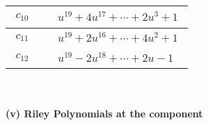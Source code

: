 \documentclass[1p]{elsarticle_modified}
\theoremstyle{definition}
\begin{document}
\begin{tabular}{m{50pt}|m{274pt}}
\hline $$\begin{aligned}c_{10}\end{aligned}$$&$\begin{aligned}
&u^{19}+4 u^{17}+\cdots+2 u^3+1
\end{aligned}$\\
\hline $$\begin{aligned}c_{11}\end{aligned}$$&$\begin{aligned}
&u^{19}+2 u^{16}+\cdots+4 u^2+1
\end{aligned}$\\
\hline $$\begin{aligned}c_{12}\end{aligned}$$&$\begin{aligned}
&u^{19}-2 u^{18}+\cdots+2 u-1
\end{aligned}$\\
\hline
\end{tabular}\\~\\
\newpage\renewcommand{\arraystretch}{1}
\flushleft \textbf{(v) Riley Polynomials at the component}\newline \\
\end{document}
